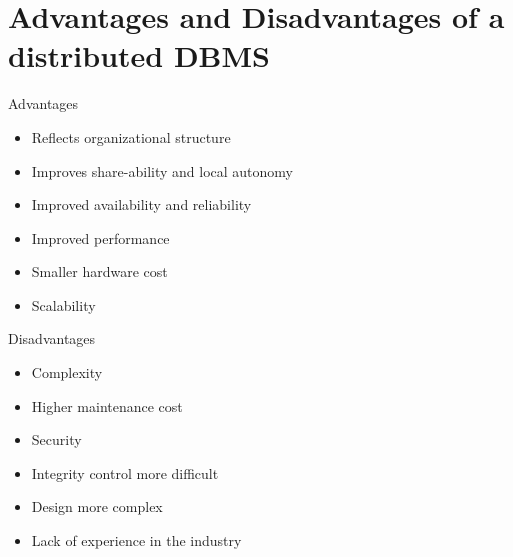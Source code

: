 \documentclass{article}[18pt]
\begin{document}
\section{Advantages and Disadvantages of a distributed DBMS}
Advantages
\begin{itemize}
	\item Reflects organizational structure
	\item Improves share-ability and local autonomy
	\item Improved availability and reliability 
	\item Improved performance
	\item Smaller hardware cost
	\item Scalability
\end{itemize}
Disadvantages
\begin{itemize}
	\item Complexity
	\item Higher maintenance cost
	\item Security
	\item Integrity control more difficult
	\item Design more complex
	\item Lack of experience in the industry
\end{itemize}
\end{document}
